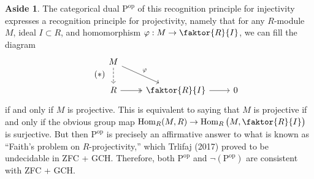 \documentclass[10pt,letterpaper,cm]{nupset}
\theoremstyle{definition}
\newtheorem*{aside}{Aside}
\newcommand{\1}{\mathbf{1}}
\newcommand{\0}{\vec 0}
\newcommand{\Rho}{\mathrm{P}}
\DeclareMathOperator{\op}{op}
\DeclareMathOperator{\Hom}{Hom}
\begin{document}
\begin{aside}
The categorical dual $\Rho^{\op}$ of this recognition principle for injectivity expresses a recognition principle for projectivity, namely that for any $R$-module $M$, ideal $I\subset R$, and homomorphism $\varphi : M \to \faktor{R}{I}$, we can fill the diagram
\[ \tag{$\ast$}
\begin{tikzcd}
M \arrow[rd, "\varphi"] \arrow[d, dashed] &  &  \\
R \arrow[r, two heads] & \faktor{R}{I} \arrow[r] & 0
\end{tikzcd}
\] if and only if $M$ is projective. This is equivalent to saying that $M$ is projective if and only if the obvious group map $\Hom_R(M, R) \to \Hom_R \big (M, \faktor{R}{I} \big)$ is surjective. 
But then $\Rho^{\op}$ is precisely an affirmative answer to what is known as ``Faith's problem on $R$-projectivity,'' which Trlifaj (2017) proved to be undecidable in ZFC + GCH. Therefore, both $\Rho^{\op}$ and $\neg (\Rho^{\op})$ are consistent with ZFC + GCH.
\end{aside}
\end{document}
